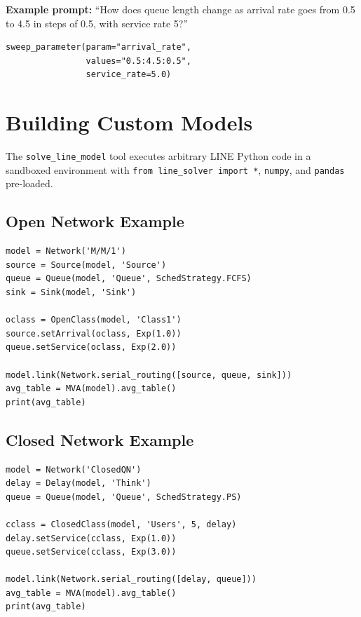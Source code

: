 \documentclass[11pt]{article}
\begin{document}
\noindent\textbf{Example prompt:} ``How does queue length change as arrival rate goes from 0.5 to 4.5 in steps of 0.5, with service rate 5?''

\begin{lstlisting}[style=pythonstyle]
sweep_parameter(param="arrival_rate",
                values="0.5:4.5:0.5",
                service_rate=5.0)
\end{lstlisting}

\section{Building Custom Models}

The \texttt{solve\_line\_model} tool executes arbitrary LINE Python code in a sandboxed environment with \texttt{from line\_solver import *}, \texttt{numpy}, and \texttt{pandas} pre-loaded.

\subsection{Open Network Example}

\begin{lstlisting}[style=pythonstyle]
model = Network('M/M/1')
source = Source(model, 'Source')
queue = Queue(model, 'Queue', SchedStrategy.FCFS)
sink = Sink(model, 'Sink')

oclass = OpenClass(model, 'Class1')
source.setArrival(oclass, Exp(1.0))
queue.setService(oclass, Exp(2.0))

model.link(Network.serial_routing([source, queue, sink]))
avg_table = MVA(model).avg_table()
print(avg_table)
\end{lstlisting}

\subsection{Closed Network Example}

\begin{lstlisting}[style=pythonstyle]
model = Network('ClosedQN')
delay = Delay(model, 'Think')
queue = Queue(model, 'Queue', SchedStrategy.PS)

cclass = ClosedClass(model, 'Users', 5, delay)
delay.setService(cclass, Exp(1.0))
queue.setService(cclass, Exp(3.0))

model.link(Network.serial_routing([delay, queue]))
avg_table = MVA(model).avg_table()
print(avg_table)
\end{lstlisting}
\end{document}
